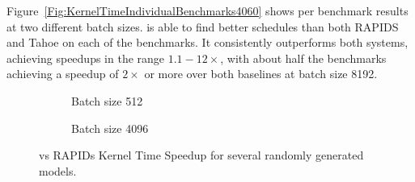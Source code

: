 Figure~\ref{Fig:KernelTimeIndividualBenchmarks4060} shows per benchmark results at two different batch sizes. \Treebeard{} is able to find better schedules than both RAPIDS and Tahoe on each of the benchmarks. It consistently outperforms both systems, achieving speedups in the range $1.1-12\times$, with about half the benchmarks achieving a speedup of $2\times$ or more  over both baselines at batch size 8192.
\begin{figure}[ht]
  \centering
  \begin{subfigure}[b]{.45\textwidth}
    \caption{Batch size 512}

  \end{subfigure}
  \begin{subfigure}[b]{.45\textwidth}
    \caption{Batch size 4096}
  \end{subfigure}
  \hfill
  \caption{\label{fig:randomModels4060}\Treebeard{} vs RAPIDs Kernel Time Speedup for several randomly generated models.}
\end{figure}

